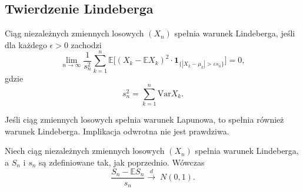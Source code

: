 \subsection{Twierdzenie Lindeberga}
	\begin{df}
		Ciąg niezależnych zmiennych losowych $(X_n)$ spełnia warunek Lindeberga, jeśli dla każdego $\epsilon > 0$ zachodzi
		\begin{equation*}
			\lim_{n \to \infty} 
			\frac{1}{s_n^2}\sum_{k = 1}^{n} 
				\mathbb{E}\big[(X_k - 	\mathbb{E}X_k)^2 \cdot \mathbf{1}_{\{ | X_k - \mu_k | > \varepsilon s_n \}}  \big] = 0,
		\end{equation*}
		gdzie 
		\begin{equation*}
		s_n^2 =  \sum_{k=1}^{n} \text{Var}X_k.
		\end{equation*}
	\end{df}
	\begin{stw}
		Jeśli ciąg zmiennych losowych spełnia warunek Lapunowa, to spełnia również warunek Lindeberga. Implikacja odwrotna nie jest prawdziwa.
	\end{stw}
	\begin{tw}
		Niech ciąg niezależnych zmiennych losowych $(X_n)$ spełnia warunek Lindeberga, a $S_n$ i $s_n$ są zdefiniowane tak, jak poprzednio. Wówczas
		\begin{equation*}
		\frac{S_n -\mathbb{E}S_n}{s_n} \stackrel{d}{\to} \; N(0,1).
		\end{equation*}
	\end{tw}